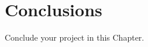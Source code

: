 
\chapter{Conclusions}\doublespacing %
Conclude your project in this Chapter.
\label{Chapter5} %







